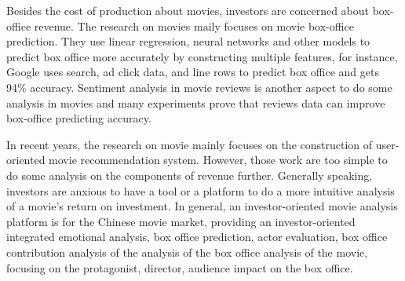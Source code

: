\par Besides the cost of production about movies, investors are concerned about box-office revenue. The research on movies maily focuses on movie box-office prediction\cite{marshall2013forecasting,basuroy2003critical,asur2010predicting}. They use linear regression, neural networks\cite{sharda2006predicting} and other models to predict box office more accurately by constructing multiple features, for instance, Google \cite{panaligan2013quantifying} uses search, ad click data, and line rows to predict box office and gets 94\% accuracy. Sentiment analysis in movie reviews \cite{manek2017aspect,kiritchenko2014sentiment,pang2008opinion} is another aspect to do some analysis in movies and many experiments\cite{gemser2007impact,joshi2010movie} prove that reviews data can improve box-office predicting accuracy.
\par In recent years, the research on movie mainly focuses on the construction of user-oriented movie recommendation system\cite{diao2014jointly,tang2015user}. However, those work are too simple to do some analysis on the components of revenue further. Generally speaking, investors are anxious to have a tool or a platform to do a more intuitive analysis of a movie's return on investment. In general, an investor-oriented movie analysis platform is for the Chinese movie market, providing an investor-oriented integrated emotional analysis, box office prediction, actor evaluation, box office contribution analysis of the analysis of the box office analysis of the movie, focusing on the protagonist, director, audience impact on the box office.
